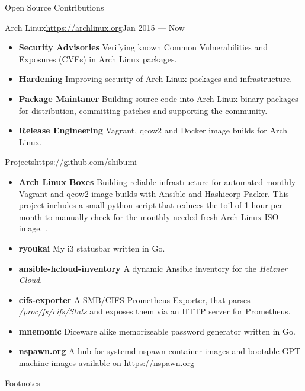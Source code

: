 \documentclass[]{mcdowellcv}
\begin{document}
\begin{cvsection}{Open Source Contributions}
\begin{cvsubsection}{Arch Linux}{\url{https://archlinux.org}}{Jan 2015 --- Now}
\begin{itemize}
\item \textbf{Security Advisories} Verifying known Common Vulnerabilities and Exposures (CVEs) in Arch Linux packages.
\item \textbf{Hardening} Improving security of Arch Linux packages and infrastructure.
\item \textbf{Package Maintaner} Building source code into Arch Linux binary packages for distribution, committing patches and supporting the community.
\item \textbf{Release Engineering} Vagrant, qcow2 and Docker image builds for Arch Linux.
\end{itemize}
\end{cvsubsection}

\begin{cvsubsection}{Projects}{\url{https://github.com/shibumi}}{}
\begin{itemize}
\item \textbf{Arch Linux Boxes} Building reliable infrastructure for automated monthly Vagrant and qcow2 image builds with Ansible and Hashicorp Packer. This project includes a small python script that reduces the toil of 1 hour per month to manually check for the monthly needed fresh Arch Linux ISO image. .
\item \textbf{ryoukai} My i3 statusbar written in Go.
\item \textbf{ansible-hcloud-inventory} A dynamic Ansible inventory for the \textit{Hetzner Cloud}.
\item \textbf{cifs-exporter} A SMB/CIFS Prometheus Exporter, that parses \textit{/proc/fs/cifs/Stats} and exposes them via an HTTP server for Prometheus.
\item \textbf{mnemonic} Diceware alike memorizeable password generator written in Go. 
\item \textbf{nspawn.org} A hub for systemd-nspawn container images and bootable GPT machine images available on \url{https://nspawn.org}
\end{itemize}
\end{cvsubsection}
\end{cvsection}

\begin{cvsection}{Footnotes}
\theendnotes
\end{cvsection}
\end{document}
